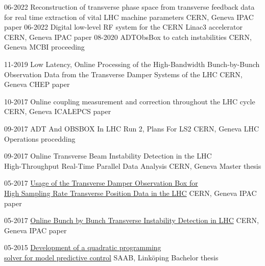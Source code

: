 \documentclass[]{cv-style}          %
\begin{document}
\begin{entrylist}  
           \entry
    {06-2022}
    {Reconstruction of transverse phase space from transverse feedback data for real time extraction of vital LHC machine parameters}
    {CERN, Geneva}
    {\emph{}{IPAC paper}}
    \entry 
    {06-2022}
    {Digital low-level RF system for the CERN Linac3 accelerator}
    {CERN, Geneva}
    {\emph{}{IPAC paper}}   
    \entry
    {08-2020}
    {ADTObsBox to catch instabilities}
    {CERN, Geneva}
    {\emph{}{MCBI proceeding}}   
   
      \entry
    {11-2019}
    {Low Latency, Online Processing of the High-Bandwidth Bunch-by-Bunch \\ Observation Data from the Transverse Damper Systems of the LHC}
    {CERN, Geneva}
    {\emph{}{CHEP paper}}  
    
      \entry
    {10-2017}
    {Online coupling measurement and correction throughout the LHC cycle}
    {CERN, Geneva}
    {\emph{}{ICALEPCS paper}}   

  
      \entry
    {09-2017}
    {ADT And OBSBOX In LHC Run 2, Plans For LS2}
    {CERN, Geneva}
    {\emph{}{LHC Operations procedding}}
       
      \entry
    {09-2017}
    {Online Transverse Beam Instability Detection in the LHC\\High-Throughput Real-Time Parallel Data Analysis}
    {CERN, Geneva}
    {\emph{}{Master thesis}}

      \entry
    {05-2017}
    {\href{http://accelconf.web.cern.ch/AccelConf/ipac2017/papers/mopab117.pdf}{Usage of the Transverse Damper Observation Box for \\High Sampling Rate Transverse Position Data in the LHC}}
    {CERN, Geneva}
    {\emph{}{IPAC paper}}

  \entry
    {05-2017}
    {\href{http://accelconf.web.cern.ch/AccelConf/ipac2017/papers/mopab117.pdf}{Online Bunch by Bunch Transverse Instability Detection in LHC}}
    {CERN, Geneva}
    {\emph{}{IPAC paper}}
  

  \entry
    {05-2015}
    {\href{http://liu.diva-portal.org/smash/get/diva2:844414/FULLTEXT01.pdf}{Development of a quadratic programming \\ solver for model predictive control}}
    {SAAB, Linköping}
    {\emph{}{Bachelor thesis}}
   
    
\end{entrylist}

\end{document}
